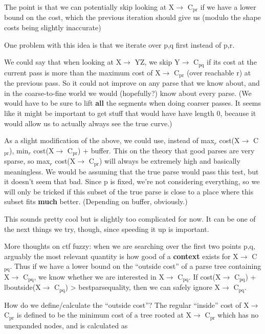 \documentclass{book}
\begin{document}
\begin{itemize}
    The point is that we can potentially skip looking at X$\to$ C$_{\mathrm{pr}}$ if
    we have a lower bound on the cost, which the previous iteration
    should give us (modulo the shape costs being slightly inaccurate)

    One problem with this idea is that we iterate over p,q first
    instead of p,r.

    We could say that when looking at X$\to$ YZ, we skip Y$\to$ C$_{\mathrm{pq}}$ if
    its cost at the current pass is more than the maximum cost of X$\to$
    C$_{\mathrm{pr}}$ (over reachable r) at the previous pass. So it could not
    improve on any parse that we know about, and in the coarse-to-fine
    world we would (hopefully?) know about every parse. (We would have
    to be sure to lift \textbf{all} the segments when doing coarser
    passes. It seems like it might be important to get stuff that
    would have have length 0, because it would allow us to actually
    always see the true curve.)

    As a slight modification of the above, we could use, instead of
    max$_r$ cost(X$\to$ C$_{\mathrm{pr}}$), min$_r$ cost(X$\to$ C$_{\mathrm{pr}}$) + buffer. This on the
    theory that good parses are very sparse, so max$_r$ cost(X$\to$ C$_{\mathrm{pr}}$)
    will always be extremely high and basically meaningless. We would
    be assuming that the true parse would pass this test, but it
    doesn't seem that bad. Since p is fixed, we're not considering
    everything, so we will only be tricked if this subset of the true
    parse is close to a place where this subset fits \textbf{much}
    better. (Depending on buffer, obviously.)

    This sounds pretty cool but is slightly too complicated for
    now. It can be one of the next things we try, though, since
    speeding it up is important.

    More thoughts on ctf fuzzy: when we are searching over the first
    two points p,q, arguably the most relevant quantity is how good of
    a \textbf{context} exists for X$\to$ C$_{\mathrm{pq}}$. Thus if we have a lower bound on
    the ``outside cost'' of a parse tree containing X$\to$ C$_{\mathrm{pq}}$, we know
    whether we are interested in X$\to$ C$_{\mathrm{pq}}$. If cost(X$\to$ C$_{\mathrm{pq}}$) +
    lboutside(X$\to$ C$_{\mathrm{pq}}$) > bestparsequality, then we can safely ignore
    X$\to$ C$_{\mathrm{pq}}$.

    How do we define/calculate the ``outside cost''? The regular
    ``inside'' cost of X$\to$ C$_{\mathrm{pr}}$ is defined to be the minimum cost of a
    tree rooted at X$\to$ C$_{\mathrm{pr}}$ which has no unexpanded nodes, and is
    calculated as 


\end{itemize}
\end{document}
